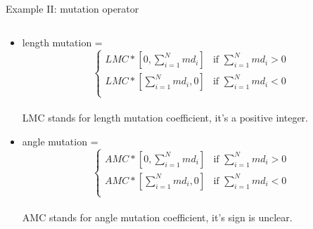 \documentclass{beamer}
\begin{document}
\begin{frame}{Example II: mutation operator}
    \begin{columns}[c]
	\begin{column}{1\textwidth}
		\begin{itemize}
			\item length mutation =  
				\[
				  \begin{cases}
					  LMC*[0, \sum_{i=1}^{N}{md_i}] & \text{if $\sum_{i=1}^{N}{md_i} > 0$} \\
					  LMC*[\sum_{i=1}^{N}{md_i}, 0] & \text{if $\sum_{i=1}^{N}{md_i} < 0$} \\
				  \end{cases}
				\] \\
				LMC stands for length mutation coefficient, it's a positive integer.
			\item angle mutation = 
				\[
				  \begin{cases}
					  AMC*[0, \sum_{i=1}^{N}{md_i}] & \text{if $\sum_{i=1}^{N}{md_i} > 0$} \\
					  AMC*[\sum_{i=1}^{N}{md_i}, 0] & \text{if $\sum_{i=1}^{N}{md_i} < 0$} \\
				  \end{cases}
				\] \\
				AMC stands for angle mutation coefficient, it's sign is unclear.
		\end{itemize}
	\end{column}
\end{columns}
\end{frame}
\end{document}

